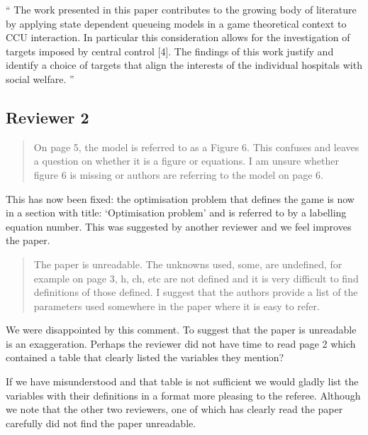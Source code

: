 \documentclass{article}
\begin{document}
``
The work presented in this paper contributes to the growing body of literature by applying state dependent queueing models in a game theoretical context to CCU interaction.
In particular this consideration allows for the investigation of targets imposed by central control [4].
The findings of this work justify and identify a choice of targets that align the interests of the individual hospitals with social welfare.
''

\subsection{Reviewer 2}

\begin{quote}
    \begin{textit}{
    On page 5, the model is referred to as a Figure 6. This confuses and leaves a question on whether it is a figure or equations. I am unsure whether figure 6 is missing or authors are referring to the model on page 6.
    }\end{textit}
\end{quote}

This has now been fixed: the optimisation problem that defines the game is now
in a section with title: `Optimisation problem' and is referred to by a
labelling equation number. This was suggested by another reviewer and we feel
improves the paper.

\begin{quote}
    \begin{textit}{
The paper is unreadable. The unknowns used, some, are undefined, for example on page 3, h, ch, etc are not defined and it is very difficult to find definitions of those defined. I suggest that the authors provide a list of the parameters used somewhere in the paper where it is easy to refer.
    }\end{textit}
\end{quote}

We were disappointed by this comment. To suggest that the paper is unreadable
is an exaggeration. Perhaps the reviewer did not have time to read page
2 which contained a table that clearly listed the variables they mention?

If we have misunderstood and that table is not sufficient we would gladly list
the variables with their definitions in a format more pleasing to the referee.
Although we note that the other two reviewers, one of which has clearly read
the paper carefully did not find the paper unreadable.
\end{document}
